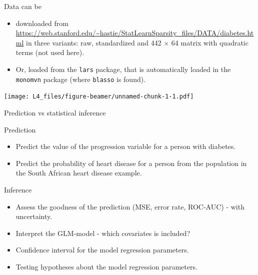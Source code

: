 \documentclass[
  ignorenonframetext,
]{beamer}
\providecommand{\tightlist}{%
  \setlength{\itemsep}{0pt}\setlength{\parskip}{0pt}}
\begin{document}
\begin{frame}[fragile]

Data can be

\begin{itemize}
\tightlist
\item
  downloaded from
  \url{https://web.stanford.edu/~hastie/StatLearnSparsity_files/DATA/diabetes.html}
  in three variants: raw, standardized and 442 \(\times\) 64 matrix with
  quadratic terms (not used here).
\item
  Or, loaded from the \texttt{lars} package, that is automatically
  loaded in the \texttt{monomvn} package (where \texttt{blasso} is
  found).
\end{itemize}

\end{frame}

\begin{frame}

\texttt{[image: L4\_files/figure-beamer/unnamed-chunk-1-1.pdf]}

\end{frame}

\begin{frame}

\begin{block}{Prediction vs statistical inference}

\begin{block}{Prediction}

\begin{itemize}
\tightlist
\item
  Predict the value of the progression variable for a person with
  diabetes.
\item
  Predict the probability of heart disease for a person from the
  population in the South African heart disease example.
\end{itemize}

\end{block}

\begin{block}{Inference}

\begin{itemize}
\tightlist
\item
  Assess the goodness of the prediction (MSE, error rate, ROC-AUC) -
  with uncertainty.
\item
  Interpret the GLM-model - which covariates is included?
\item
  Confidence interval for the model regression parameters.
\item
  Testing hypotheses about the model regression parameters.
\end{itemize}

\end{block}

\end{block}

\end{frame}
\end{document}
